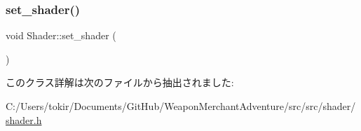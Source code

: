 \mbox{\label{class_shader_a0494397acc115e563051c5adfa3ea6db}} 
\subsubsection{\texorpdfstring{set\+\_\+shader()}{set\_shader()}}
{\footnotesize\ttfamily void Shader\+::set\+\_\+shader (\begin{DoxyParamCaption}{ }\end{DoxyParamCaption})\hspace{0.3cm}{\ttfamily [inline]}}



このクラス詳解は次のファイルから抽出されました\+:\begin{DoxyCompactItemize}
\item 
C\+:/\+Users/tokir/\+Documents/\+Git\+Hub/\+Weapon\+Merchant\+Adventure/src/src/shader/\mbox{\hyperlink{shader_8h}{shader.\+h}}\end{DoxyCompactItemize}
